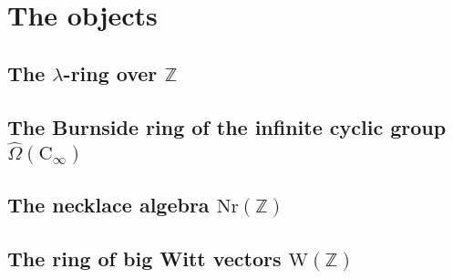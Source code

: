 \section{The objects}

\subsection{The $\lambda$-ring over $\mathbb{Z}$}


\subsection{The Burnside ring of the infinite cyclic group $\hat{\Omega}(\mathrm{C}_\infty)$}


\subsection{The necklace algebra $\mathrm{Nr}(\mathbb{Z})$}


\subsection{The ring of big Witt vectors $\mathrm{W}(\mathbb{Z})$}
